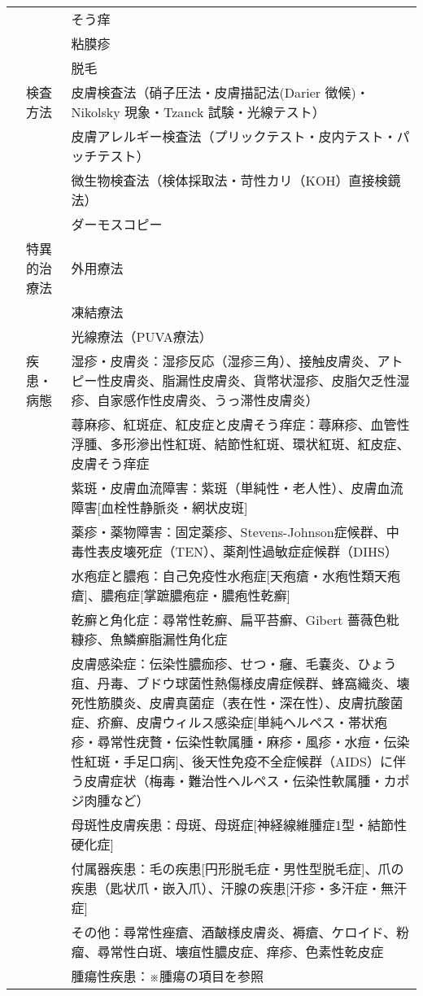 \begin{xltabular}{\linewidth}{XXX}
 &  & そう痒 \\
 &  & 粘膜疹 \\
 &  & 脱毛 \\
 & 検査方法 & 皮膚検査法（硝子圧法・皮膚描記法(Darier 徴候)・Nikolsky 現象・Tzanck 試験・光線テスト） \\
 &  & 皮膚アレルギー検査法（プリックテスト・皮内テスト・パッチテスト） \\
 &  & 微生物検査法（検体採取法・苛性カリ（KOH）直接検鏡法） \\
 &  & ダーモスコピー \\
 & 特異的治療法 & 外用療法 \\
 &  & 凍結療法 \\
 &  & 光線療法（PUVA療法） \\
 & 疾患・病態 & 湿疹・皮膚炎：湿疹反応（湿疹三角）、接触皮膚炎、アトピー性皮膚炎、脂漏性皮膚炎、貨幣状湿疹、皮脂欠乏性湿疹、自家感作性皮膚炎、うっ滞性皮膚炎） \\
 &  & 蕁麻疹、紅斑症、紅皮症と皮膚そう痒症：蕁麻疹、血管性浮腫、多形滲出性紅斑、結節性紅斑、環状紅斑、紅皮症、皮膚そう痒症 \\
 &  & 紫斑・皮膚血流障害：紫斑（単純性・老人性）、皮膚血流障害[血栓性静脈炎・網状皮斑] \\
 &  & 薬疹・薬物障害：固定薬疹、Stevens-Johnson症候群、中毒性表皮壊死症（TEN）、薬剤性過敏症症候群（DIHS） \\
 &  & 水疱症と膿疱：自己免疫性水疱症[天疱瘡・水疱性類天疱瘡]、膿疱症[掌蹠膿疱症・膿疱性乾癬] \\
 &  & 乾癬と角化症：尋常性乾癬、扁平苔癬、Gibert 薔薇色粃糠疹、魚鱗癬脂漏性角化症 \\
 &  & 皮膚感染症：伝染性膿痂疹、せつ・癰、毛嚢炎、ひょう疽、丹毒、ブドウ球菌性熱傷様皮膚症候群、蜂窩織炎、壊死性筋膜炎、皮膚真菌症（表在性・深在性）、皮膚抗酸菌症、疥癬、皮膚ウィルス感染症[単純ヘルペス・帯状疱疹・尋常性疣贅・伝染性軟属腫・麻疹・風疹・水痘・伝染性紅斑・手足口病]、後天性免疫不全症候群（AIDS）に伴う皮膚症状（梅毒・難治性ヘルペス・伝染性軟属腫・カポジ肉腫など） \\
 &  & 母斑性皮膚疾患：母斑、母斑症[神経線維腫症1型・結節性硬化症] \\
 &  & 付属器疾患：毛の疾患[円形脱毛症・男性型脱毛症]、爪の疾患（匙状爪・嵌入爪）、汗腺の疾患[汗疹・多汗症・無汗症] \\
 &  & その他：尋常性痤瘡、酒皶様皮膚炎、褥瘡、ケロイド、粉瘤、尋常性白斑、壊疽性膿皮症、痒疹、色素性乾皮症 \\
 &  & 腫瘍性疾患：※腫瘍の項目を参照 \\

\end{xltabular}
